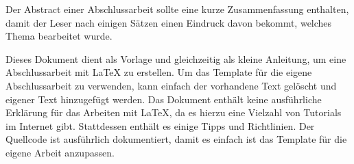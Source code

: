 Der Abstract einer Abschlussarbeit sollte eine kurze Zusammenfassung enthalten, damit der Leser nach einigen Sätzen einen Eindruck davon bekommt, welches Thema bearbeitet wurde.

Dieses Dokument dient als Vorlage und gleichzeitig als kleine Anleitung, um eine Abschlussarbeit mit \LaTeX{} zu erstellen. Um das Template für die eigene Abschlussarbeit zu verwenden, kann einfach der vorhandene Text gelöscht und eigener Text hinzugefügt werden. Das Dokument enthält keine ausführliche Erklärung für das Arbeiten mit \LaTeX{}, da es hierzu eine Vielzahl von Tutorials im Internet gibt. Stattdessen enthält es einige Tipps und Richtlinien. Der Quellcode ist ausführlich dokumentiert, damit es einfach ist das Template für die eigene Arbeit anzupassen.